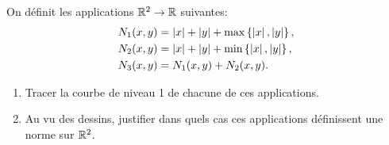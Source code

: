 \documentclass[a4paper]{tp_um}
\begin{document}
\exo{} 
On définit les  applications $\mathbb{R}^2\to\mathbb{R}$ suivantes:
\begin{align*}
    N_1(x,y) &= \left\lvert x\right\rvert + \left\lvert y\right\rvert + \max\left\{ \left\lvert x\right\rvert, \left\lvert y\right\rvert \right\},\\
    N_2(x,y) &= \left\lvert x\right\rvert + \left\lvert y\right\rvert + \min\left\{ \left\lvert x\right\rvert, \left\lvert y\right\rvert \right\},\\
    N_3(x,y) &= N_1(x,y) + N_2(x,y).
\end{align*}
        \begin{enumerate}
            \item  Tracer la courbe de niveau 1 de chacune de ces applications.
            \item Au vu des dessins, justifier dans quels cas ces applications définissent une norme sur $\mathbb{R}^2$.
        \end{enumerate}


\bigskip 
\end{document}
